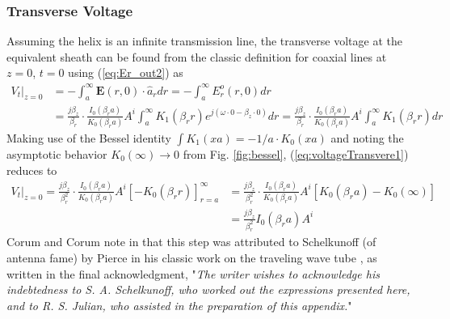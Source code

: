 \subsubsection{Transverse Voltage}
Assuming the helix is an infinite transmission line, the transverse voltage at the equivalent sheath can be found from the classic definition for coaxial lines at $z=0$, $t=0$ using (\ref{eq:Er_out2}) as
\begin{equation}\label{eq:voltageTransvere1}
\begin{split}
	\left. V_t \right|_{z=0} 
	&= - \int_{a}^{\infty} \mathbf{E}(r,0) \cdot \hat{a}_r dr = - \int_{a}^{\infty} E_r^o(r,0) dr \\[3pt]
	&= \frac{j\beta_z}{\beta_r} \cdot \frac{I_0(\beta_r a)}{K_0(\beta_r a)} 
	A^i \int_{a}^{\infty} K_1(\beta_r r) e^{j(\omega \cdot 0 - \beta_z \cdot 0)} dr = \frac{j\beta_z}{\beta_r} \cdot \frac{I_0(\beta_r a)}{K_0(\beta_r a)} 
	A^i \int_{a}^{\infty} K_1(\beta_r r) dr
\end{split}
\end{equation}
Making use of the Bessel identity $\int K_{1}(xa) = -1/a \cdot K_{0}(xa)$ and noting the asymptotic behavior $K_{0}(\infty) \rightarrow 0$ from Fig. \ref{fig:bessel}, (\ref{eq:voltageTransvere1}) reduces to  
\begin{equation}
	\begin{split}
	\left. V_t \right|_{z=0} = \frac{j\beta_z}{\beta_r^2} \cdot \frac{I_0(\beta_r a)}{K_0(\beta_r a)} A^i \left[ -K_0(\beta_r r) \right]_{r=a}^{\infty} &= \frac{j\beta_z}{\beta_r^2} \cdot \frac{I_0(\beta_r a)}{K_0(\beta_r a)} A^i \left[ K_0(\beta_r a) - K_0(\infty) \right] \\[4pt]
	&= \frac{j\beta_z}{\beta_r^2} I_0(\beta_r a) A^i
	\end{split}
\end{equation}
Corum and Corum note in \cite{corum1} that this step was attributed to Schelkunoff (of antenna fame) by Pierce in his classic work on the traveling wave tube \cite{pierce1}, as written in the final acknowledgment, "\textit{The writer wishes to acknowledge his indebtedness to S. A. Schelkunoff, who worked out the expressions presented here, and to R. S. Julian, who assisted in the preparation of this appendix.}"
